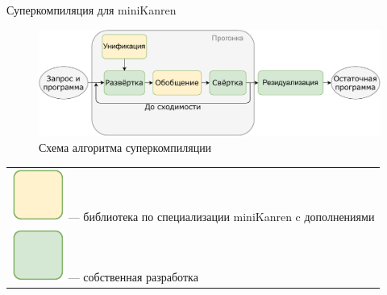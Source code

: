 \documentclass[xcolor=table]{beamer}
\renewcommand{\footnotesize}{\tiny}
\begin{document}
%
%

%
%
\begin{frame}{Суперкомпиляция для miniKanren}

\begin{figure}[h!]
\center
\includegraphics[scale=0.55]{scompflow.pdf}
\caption{
    Схема алгоритма суперкомпиляции\\
}
\label{fig:scomp}
\end{figure}
{\footnotesize
\begin{tabular}{l}
\includegraphics[scale=0.4]{orange.pdf} --- библиотека по специализации miniKanren c дополнениями\\
\includegraphics[scale=0.4]{green.pdf} --- собственная разработка
\end{tabular}
}



\end{frame}
\end{document}
